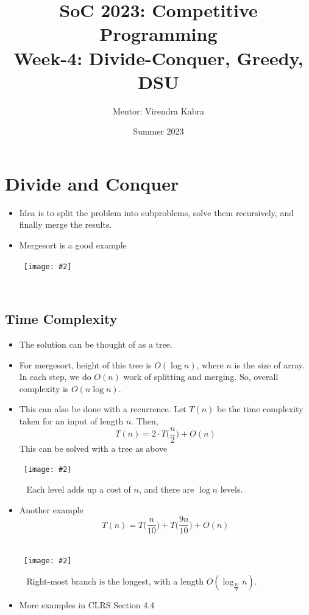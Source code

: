 \documentclass{article}
\title{\textbf{SoC 2023: Competitive Programming \\ {\Large Week-4: Divide-Conquer, Greedy, DSU}}}
\author{Mentor: Virendra Kabra}
\date{Summer 2023}
\newcommand{\image}[2]{\
    \begin{center}\
        \texttt{[image: \#2]}\
    \end{center}\
}
\begin{document}
\begin{sloppypar}       %

    \maketitle
    \tableofcontents
    \thispagestyle{empty}

    \newpage

    \section{Divide and Conquer}

    \begin{itemize}
        \item Idea is to split the problem into subproblems, solve them recursively, and finally merge the results.
        \item Mergesort is a good example
        \image{0.7}{../images/mergesort.png}
    \end{itemize}

    \subsection{Time Complexity}
    \begin{itemize}
        \item The solution can be thought of as a tree.
        \item For mergesort, height of this tree is $O(\log n)$, where $n$ is the size of array. In each step, we do $O(n)$ work of splitting and merging. So, overall complexity is $O(n\log n)$.
        \item This can also be done with a recurrence. Let $T(n)$ be the time complexity taken for an input of length $n$. Then,
        $$T(n) = 2\cdot T\bigg(\frac{n}{2}\bigg) + O(n)$$
        This can be solved with a tree as above
        \image{0.8}{../images/rec-tree-1.png}
        Each level adds up a cost of $n$, and there are $\log n$ levels.
        \item Another example
        $$T(n) = T\bigg(\frac{n}{10}\bigg) + T\bigg(\frac{9n}{10}\bigg) + O(n)$$
        \image{0.8}{../images/rec-tree-2.png}
        Right-most branch is the longest, with a length $O(\log_{\frac{10}{9}} n)$.
        \item More examples in CLRS Section 4.4
    \end{itemize}


\end{sloppypar}
\end{document}
